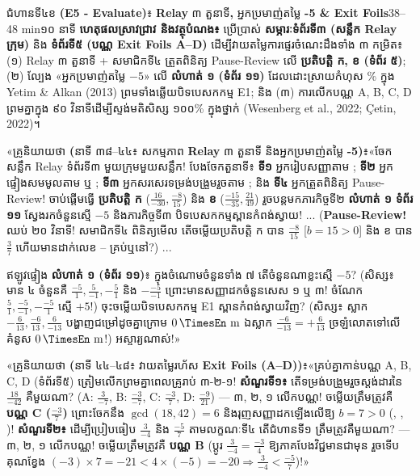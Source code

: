 \documentclass[a4paper,12pt]{article}
\newcommand{\en}[1]{{\TimesEn #1}}
\newcommand{\enbf}[1]{{\TimesEn\textbf{#1}}}
\newcommand{\unit}[1]{\,\text{\en{#1}}}
\newcommand{\cnum}[1]{{\TimesEn\fontsize{10.5pt}{12pt}\selectfont\ding{\numexpr181+#1\relax}}}
\newcommand{\teachersay}[1]{{\muol\fontsize{10.8pt}{15.5pt}\selectfont «គ្រូនិយាយថា \enbf{(}#1\enbf{)}៖}\hspace{0.25em}}
\begin{document}
\begin{phasebox}{ជំហានទី៤ខ \enbf{(E5 - Evaluate)}៖ \enbf{Relay} ៣ តួនាទី\enbf{,} អ្នកប្រមាញ់តម្លៃ \enbf{-5 \& Exit Foils}}{38--48 min}{១០ នាទី}
\textbf{ហេតុផលស្រាវជ្រាវ និងវត្ថុបំណង៖} ប្រើប្រាស់ \textbf{សម្ភារៈទំព័រទី៣ (សន្លឹក \en{Relay} ក្រុម)} និង \textbf{ទំព័រទី៥ (បណ្ណ \en{Exit Foils A--D})} ដើម្បីវាយតម្លៃការផ្ទេរចំណេះដឹងទាំង ៣ កម្រិត៖ (១) \en{Relay} ៣ តួនាទី + សមាជិកទី៤ ត្រួតពិនិត្យ \en{Pause-Review} លើ \textbf{ប្រតិបត្តិ ក, ខ (ទំព័រ ៥)}; (២) ល្បែង «អ្នកប្រមាញ់តម្លៃ $-5$» លើ \textbf{លំហាត់ ១ (ទំព័រ ១១)} ដែលដោះស្រាយកំហុស \en{80.8\%} ក្នុង \en{Yetim \& Alkan (2013)} ព្រមទាំងឆ្លើយបិទបេសកកម្ម \en{E1}; និង (៣) ការលើកបណ្ណ \en{A, B, C, D} ព្រមគ្នាក្នុង ៩០ វិនាទីដើម្បីស្ទង់មតិសិស្ស ១០០\% ក្នុងថ្នាក់ \en{(Wesenberg et al., 2022; Çetin, 2022)}។
\end{phasebox}
\begin{scriptbox}
  \teachersay{នាទី ៣៨--៤៤៖ សកម្មភាព \enbf{Relay} ៣ តួនាទី និងអ្នកប្រមាញ់តម្លៃ \enbf{-5}}«ចែកសន្លឹក \en{Relay} ទំព័រទី៣ មួយក្រុមមួយសន្លឹក! បែងចែកតួនាទី៖ \textbf{ទី១} អ្នករៀបសញ្ញាតាម \cnum{3}; \textbf{ទី២} អ្នកផ្ទៀងសមមូលតាម \cnum{1} ឬ \cnum{2}; \textbf{ទី៣} អ្នកសរសេរទម្រង់បង្រួមរួចតាម \cnum{5}; និង \textbf{ទី៤} អ្នកត្រួតពិនិត្យ \en{Pause-Review}! ចាប់ផ្ដើមធ្វើ \textbf{ប្រតិបត្តិ ក} ($\frac{16}{-30}, \frac{-8}{15}$) និង \textbf{ខ} ($\frac{-15}{-35}, \frac{21}{49}$) រួចបន្តមកភារកិច្ចទី២ \textbf{លំហាត់ ១ ទំព័រ ១១} ស្វែងរកចំនួនស្មើ $-5$ និងភារកិច្ចទី៣ បិទបេសកកម្មស្ពានកំពង់ស្វាយ! ... (\textbf{\en{Pause-Review!}} ឈប់ ២០ វិនាទី! សមាជិកទី៤ ពិនិត្យមើល តើចម្លើយប្រតិបត្តិ ក បាន $\frac{-8}{15}$ [$b=15>0$] និង ខ បាន $\frac{3}{7}$ ហើយមានដាក់លេខ \cnum{1}--\cnum{5} គ្រប់ឬនៅ?) ...\par
  ឥឡូវផ្ទៀង \textbf{លំហាត់ ១ (ទំព័រ ១១)}៖ ក្នុងចំណោមចំនួនទាំង ៧ តើចំនួនណាខ្លះស្មើ $-5$? (សិស្ស៖ មាន ៤ ចំនួនគឺ $\frac{-5}{1}, \frac{5}{-1}, -\frac{5}{1}$ និង $-\frac{-5}{-1}$ ព្រោះមានសញ្ញាដកចំនួនសេស ១ ឬ ៣! ចំណែក $\frac{5}{1}, \frac{-5}{-1}, -\frac{-5}{1}$ ស្មើ $+5$!) ចុះចម្លើយបិទបេសកកម្ម \en{E1} ស្ពានកំពង់ស្វាយវិញ? (សិស្ស៖ ស្លាក $-\frac{6}{13}, \frac{-6}{13}, \frac{6}{-13}$ បង្ហាញជម្រៅដូចគ្នាក្រោម $0\unit{m}$ ឯស្លាក $\frac{-6}{-13}=+\frac{6}{13}$ ច្រឡំលោតទៅលើគំនូស $0\unit{m}$!) អស្ចារ្យណាស់!»\par\vspace{2.5pt}
  \teachersay{នាទី ៤៤--៤៨៖ វាយតម្លៃរហ័ស \enbf{Exit Foils (A--D)}}«គ្រប់គ្នាកាន់បណ្ណ \en{A, B, C, D} (ទំព័រទី៥) ត្រៀមលើកព្រមគ្នាពេលគ្រូរាប់ ៣-២-១! \textbf{សំណួរទី១៖} តើទម្រង់បង្រួមរួចស្ដង់ដារនៃ $\frac{18}{-42}$ គឺមួយណា? (\en{A: $\frac{3}{-7}$, B: $\frac{-3}{-7}$, C: $\frac{-3}{7}$, D: $\frac{-9}{21}$}) — ៣, ២, ១ លើកបណ្ណ! ចម្លើយត្រឹមត្រូវគឺ \textbf{បណ្ណ \en{C} ($\frac{-3}{7}$)} ព្រោះចែកនឹង $\gcd(18,42)=6$ និងរុញសញ្ញាដកឡើងលើឱ្យ $b=7>0$ (\cnum{2}, \cnum{3}, \cnum{5})! \textbf{សំណួរទី២៖} ដើម្បីប្រៀបធៀប $\frac{3}{-4}$ និង $\frac{-5}{7}$ តាមលក្ខណៈទី៤ តើជំហានទី១ ត្រឹមត្រូវគឺមួយណា? — ៣, ២, ១ លើកបណ្ណ! ចម្លើយត្រឹមត្រូវគឺ \textbf{បណ្ណ \en{B}} (ប្ដូរ $\frac{3}{-4}=\frac{-3}{4}$ ឱ្យភាគបែងវិជ្ជមានជាមុន រួចទើបគុណខ្វែង $(-3)\times 7 = -21 < 4\times(-5) = -20 \Rightarrow \frac{3}{-4}<\frac{-5}{7}$)!»
\end{scriptbox}
\end{document}
